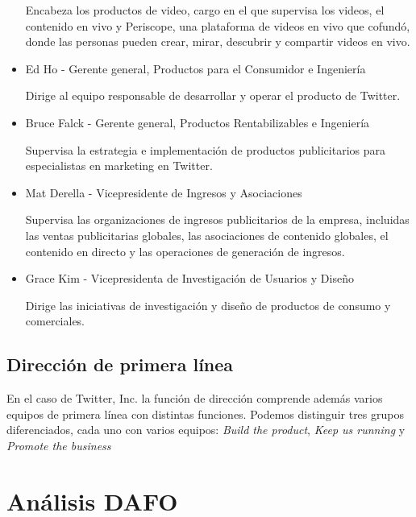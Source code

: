 \begin{itemize}
Encabeza los productos de video, cargo en el que supervisa los videos, el contenido en vivo y Periscope, una plataforma de videos en vivo que cofundó, donde las personas pueden crear, mirar, descubrir y compartir videos en vivo.

\item Ed Ho - Gerente general, Productos para el Consumidor e Ingeniería

Dirige al equipo responsable de desarrollar y operar el producto de Twitter.

\item Bruce Falck - Gerente general, Productos Rentabilizables e Ingeniería

Supervisa la estrategia e implementación de productos publicitarios para especialistas en marketing en Twitter.

\item Mat Derella - Vicepresidente de Ingresos y Asociaciones

Supervisa las organizaciones de ingresos publicitarios de la empresa, incluidas las ventas publicitarias globales, las asociaciones de contenido globales, el contenido en directo y las operaciones de generación de ingresos.

\item Grace Kim - Vicepresidenta de Investigación de Usuarios y Diseño

Dirige las iniciativas de investigación y diseño de productos de consumo y comerciales.

\end{itemize}

\subsection{Dirección de primera línea}

En el caso de Twitter, Inc. la función de dirección comprende además varios equipos de primera línea con distintas funciones. Podemos distinguir tres grupos diferenciados, cada uno con varios equipos: \textit{Build the product}, \textit{Keep us running} y \textit{Promote the business}

\section{Análisis DAFO}